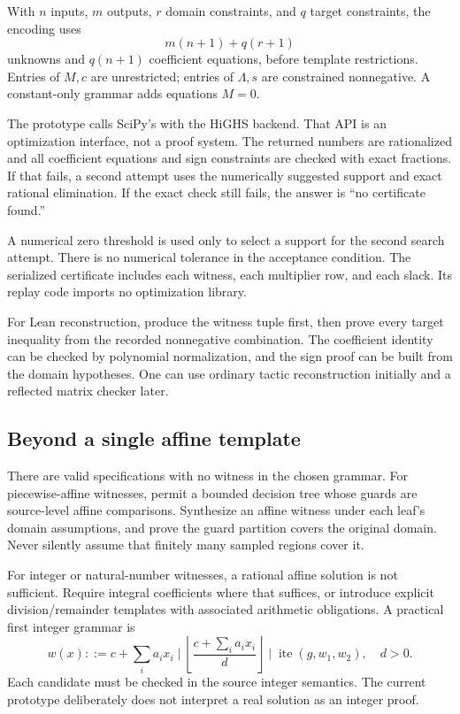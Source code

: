 With $n$ inputs, $m$ outputs, $r$ domain constraints, and $q$ target constraints,
the encoding uses
\[
m(n+1)+q(r+1)
\]
unknowns and $q(n+1)$ coefficient equations, before template restrictions.
Entries of $M,c$ are unrestricted; entries of $\Lambda,s$ are constrained
nonnegative. A constant-only grammar adds equations $M=0$.

The prototype calls SciPy's  with the HiGHS backend. That API
is an optimization interface, not a proof system.\cite{scipylp} The returned
numbers are rationalized and all coefficient equations and sign constraints
are checked with exact fractions. If that fails, a second attempt uses the
numerically suggested support and exact rational elimination. If the exact
check still fails, the answer is ``no certificate found.''

A numerical zero threshold is used only to select a support for the second
search attempt. There is no numerical tolerance in the acceptance condition.
The serialized certificate includes each witness, each multiplier row, and
each slack. Its replay code imports no optimization library.

For Lean reconstruction, produce the witness tuple first, then prove every
target inequality from the recorded nonnegative combination. The coefficient
identity can be checked by polynomial normalization, and the sign proof can
be built from the domain hypotheses. One can use ordinary tactic reconstruction
initially and a reflected matrix checker later.

\subsection{Beyond a single affine template}

There are valid specifications with no witness in the chosen grammar.
For piecewise-affine witnesses, permit a bounded decision tree whose guards
are source-level affine comparisons. Synthesize an affine witness under each
leaf's domain assumptions, and prove the guard partition covers the original
domain. Never silently assume that finitely many sampled regions cover it.

For integer or natural-number witnesses, a rational affine solution is not
sufficient. Require integral coefficients where that suffices, or introduce
explicit division/remainder templates with associated arithmetic obligations.
A practical first integer grammar is
\[
w(x) ::= c+\sum_i a_ix_i\mid
\left\lfloor\frac{c+\sum_i a_ix_i}{d}\right\rfloor\mid
\operatorname{ite}(g,w_1,w_2),\quad d>0.
\]
Each candidate must be checked in the source integer semantics. The current
prototype deliberately does not interpret a real solution as an integer
proof.

